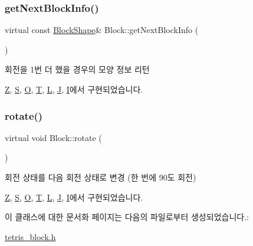 \mbox{\label{class_block_a654da164e0493be9de6f2f2334bc73e8}} 
\subsubsection{\texorpdfstring{get\+Next\+Block\+Info()}{getNextBlockInfo()}}
{\footnotesize\ttfamily virtual const \mbox{\hyperlink{class_block_aca5d951639f113e2ebd7856209d6b9ab}{Block\+Shape}}\& Block\+::get\+Next\+Block\+Info (\begin{DoxyParamCaption}{ }\end{DoxyParamCaption})\hspace{0.3cm}{\ttfamily [pure virtual]}}



회전을 1번 더 했을 경우의 모양 정보 리턴 



\mbox{\hyperlink{class_z_a6891b8f72f62e7bb3a606b0d8fc96c38}{Z}}, \mbox{\hyperlink{class_s_a48ef6d5f37afe48b14ea11fe00537c5e}{S}}, \mbox{\hyperlink{class_o_a76a288c5f887c3b24cc6cb1c03bcd9b1}{O}}, \mbox{\hyperlink{class_t_a70e028be061a3f56032317cbedccb2d3}{T}}, \mbox{\hyperlink{class_l_ae7744f0eb73bfc7bd92e1e6fcee6ec52}{L}}, \mbox{\hyperlink{class_j_aeeaf9ab45ccf61d0e7435e3d1bf04300}{J}}, \mbox{\hyperlink{class_i_ae5a6c09baa0575ff54446278a32a900a}{I}}에서 구현되었습니다.

\mbox{\label{class_block_af1499ad7e48fb750581b471d0d5bb0e0}} 
\subsubsection{\texorpdfstring{rotate()}{rotate()}}
{\footnotesize\ttfamily virtual void Block\+::rotate (\begin{DoxyParamCaption}{ }\end{DoxyParamCaption})\hspace{0.3cm}{\ttfamily [pure virtual]}}



회전 상태를 다음 회전 상태로 변경 (한 번에 90도 회전) 



\mbox{\hyperlink{class_z_aa2d629f1ad269cf21fe06b1e83ed70fa}{Z}}, \mbox{\hyperlink{class_s_a9d968087a1d499416a0ce91cce3c8f9f}{S}}, \mbox{\hyperlink{class_o_ae1c0b5ef6d51aa94765531f555b47cd0}{O}}, \mbox{\hyperlink{class_t_a56d86fc6d32cda1c47176a8b85bb6599}{T}}, \mbox{\hyperlink{class_l_aff0b530ac47a401c6f285d9ded2f997b}{L}}, \mbox{\hyperlink{class_j_a79f9fdd2b9542a95d3d2f82381b1cb62}{J}}, \mbox{\hyperlink{class_i_a5ee89d0f1ddc27429dfd0c83edf86ad5}{I}}에서 구현되었습니다.



이 클래스에 대한 문서화 페이지는 다음의 파일로부터 생성되었습니다.\+:\begin{DoxyCompactItemize}
\item 
\mbox{\hyperlink{tetris__block_8h}{tetris\+\_\+block.\+h}}\end{DoxyCompactItemize}
